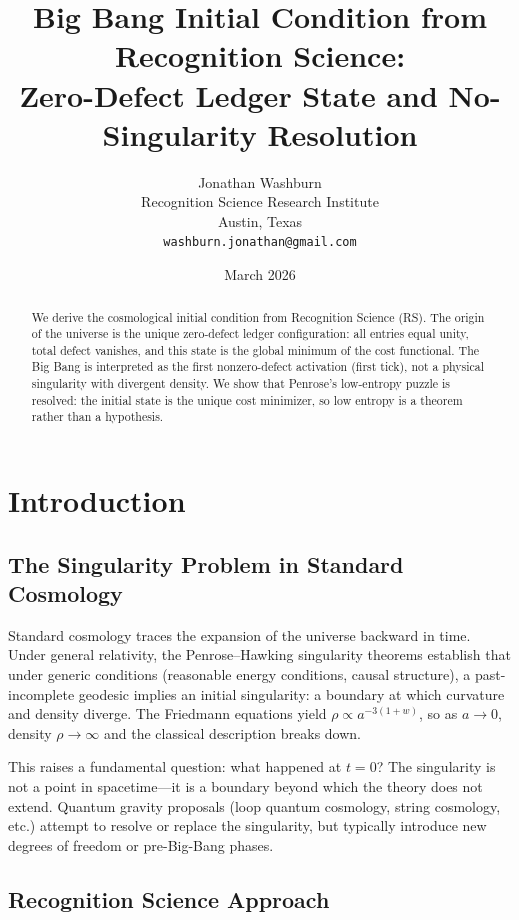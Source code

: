 \documentclass[12pt,a4paper]{article}
\title{Big Bang Initial Condition from Recognition Science:\\
Zero-Defect Ledger State and No-Singularity Resolution}
\author{Jonathan Washburn\\
Recognition Science Research Institute\\
Austin, Texas\\
\texttt{washburn.jonathan@gmail.com}}
\date{March 2026}
\theoremstyle{definition}
\theoremstyle{remark}
\begin{document}
\maketitle

\begin{abstract}
We derive the cosmological initial condition from Recognition Science (RS).
The origin of the universe is the unique zero-defect ledger configuration:
all entries equal unity, total defect vanishes, and this state is the global
minimum of the cost functional.
The Big Bang is interpreted as the first nonzero-defect activation (first tick),
not a physical singularity with divergent density.
We show that Penrose's low-entropy puzzle is resolved: the initial state is
the unique cost minimizer, so low entropy is a theorem rather than a hypothesis.
\end{abstract}

\section{Introduction}

\subsection{The Singularity Problem in Standard Cosmology}

Standard cosmology traces the expansion of the universe backward in time.
Under general relativity, the Penrose--Hawking singularity theorems
\cite{hawking1970singularities,penrose1979singularities} establish that
under generic conditions (reasonable energy conditions, causal structure),
a past-incomplete geodesic implies an initial singularity: a boundary
at which curvature and density diverge.
The Friedmann equations yield $\rho \propto a^{-3(1+w)}$, so as $a \to 0$,
density $\rho \to \infty$ and the classical description breaks down.

This raises a fundamental question: what happened at $t = 0$?
The singularity is not a point in spacetime---it is a boundary beyond which
the theory does not extend.
Quantum gravity proposals (loop quantum cosmology, string cosmology, etc.)
attempt to resolve or replace the singularity, but typically introduce
new degrees of freedom or pre-Big-Bang phases.

\subsection{Recognition Science Approach}
\end{document}

